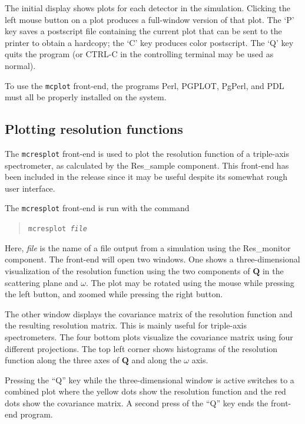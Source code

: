 The initial display shows plots for each detector in the simulation.
Clicking the left mouse button on a plot produces a full-window version
of that plot. The `P' key saves a postscript file containing the current
plot that can be sent to the printer to obtain a hardcopy; the `C' key
produces color postscript. 
The `Q' key quits the program (or CTRL-C in the controlling
terminal may be used as normal).

To use the \verb+mcplot+ front-end, the programs Perl, PGPLOT, PgPerl,
and PDL must all be properly installed on the system.



\subsection{Plotting resolution functions}
\label{s:mcresplot}

The \verb+mcresplot+ front-end is used to plot the resolution function
of a triple-axis 
spectrometer, as
calculated by the Res\_sample component. 
This front-end 
has been included in the release since it may be useful
despite its somewhat rough user interface.

The \verb+mcresplot+ front-end is run with the command
\begin{quote}
  \texttt{mcresplot {\it file\/}}
\end{quote}
Here, {\it file\/} is the name of a file output from a simulation using
the Res\_monitor component.
The front-end
will open two windows. One shows a three-dimensional visualization of
the resolution function using the two components of $\boldsymbol{Q}$ in
the scattering plane and $\omega$. The plot may be rotated using the
mouse while pressing the left button, and zoomed while pressing the
right button.

The other window displays the covariance matrix of the resolution
function and the resulting resolution matrix. This is mainly useful for
triple-axis spectrometers. The four bottom plots visualize the
covariance matrix using four different projections. The top left corner
shows histograms of the resolution function along the three axes of
$\boldsymbol{Q}$ and along the $\omega$ axis.

Pressing the ``Q'' key while the three-dimensional window is active
switches to a combined plot where the yellow dots show the resolution
function and the red dots show the covariance matrix. A second press of
the ``Q'' key ends the front-end program.

